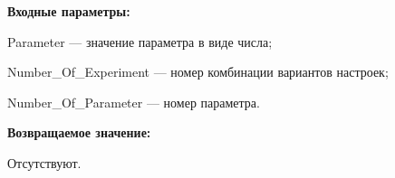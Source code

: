 \textbf{Входные параметры:}

	 Parameter --- значение параметра в виде числа;
 
    Number\_Of\_Experiment --- номер комбинации вариантов настроек;
 
    Number\_Of\_Parameter --- номер параметра.

\textbf{Возвращаемое значение:}

Отсутствуют.